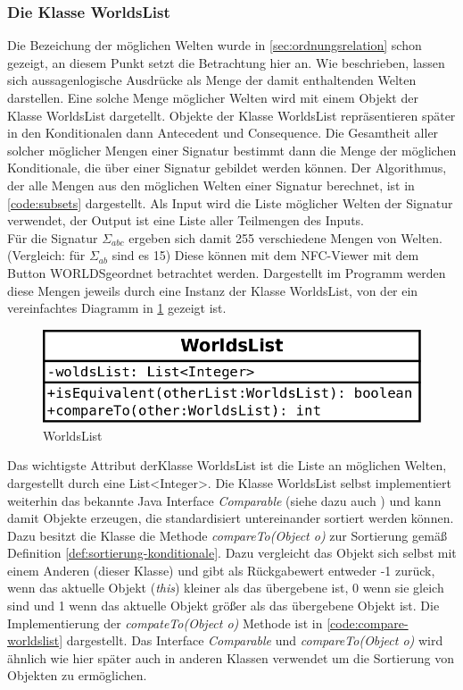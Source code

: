 \documentclass[12pt,a4paper]{article}
\begin{document}
\subsubsection{Die Klasse WorldsList}
\label{sec:worldslist}
Die Bezeichung der möglichen Welten wurde in \autoref{sec:ordnungsrelation} schon gezeigt, an diesem Punkt setzt die Betrachtung hier an. Wie beschrieben, lassen sich aussagenlogische Ausdrücke als Menge der damit enthaltenden Welten darstellen. Eine solche Menge möglicher Welten wird mit einem Objekt der Klasse WorldsList dargetellt. Objekte der Klasse WorldsList repräsentieren später in den Konditionalen dann Antecedent und Consequence. Die Gesamtheit aller solcher möglicher Mengen einer Signatur bestimmt dann die Menge der möglichen Konditionale, die über einer Signatur gebildet werden können. Der Algorithmus, der alle Mengen aus den möglichen Welten einer Signatur berechnet, ist in \autoref{code:subsets} dargestellt. Als Input wird die Liste möglicher Welten der Signatur verwendet, der Output ist eine Liste aller Teilmengen des Inputs. \\
Für die Signatur $\Sigma_{abc}$ ergeben sich damit 255 verschiedene Mengen von Welten. (Vergleich: für $\Sigma_{ab}$ sind es 15) Diese können mit dem NFC-Viewer mit dem Button \glqq WORLDS\grqq \space geordnet betrachtet werden. Dargestellt im Programm werden diese Mengen jeweils durch eine Instanz der Klasse WorldsList, von der ein vereinfachtes Diagramm in \ref{pic:worldslist} gezeigt ist. 


\begin{figure}
\includegraphics[width=0.45\linewidth]{bilder/worldslist.png}
\caption{WorldsList}
\label{pic:worldslist}
\end{figure}


Das wichtigste Attribut derKlasse WorldsList ist die Liste an möglichen Welten, dargestellt durch eine List<Integer>. Die Klasse WorldsList selbst implementiert weiterhin das bekannte Java Interface  \textit{Comparable} (siehe dazu auch \cite{oracle2019}) und kann damit Objekte erzeugen, die standardisiert untereinander sortiert werden können. Dazu besitzt die Klasse die Methode \textit{compareTo(Object o)} zur Sortierung gemäß Definition \ref{def:sortierung-konditionale}. Dazu vergleicht das Objekt sich selbst mit einem Anderen (dieser Klasse) und gibt als Rückgabewert entweder -1 zurück, wenn das aktuelle  Objekt (\textit{this}) kleiner als das übergebene ist, 0 wenn sie gleich sind und 1 wenn das aktuelle Objekt größer als das übergebene Objekt ist. Die Implementierung der \textit{compateTo(Object o)} Methode ist in \autoref{code:compare-worldslist} dargestellt. Das Interface  \textit{Comparable} und \textit{compareTo(Object o)} wird ähnlich wie hier später auch in anderen Klassen verwendet um die Sortierung von Objekten zu ermöglichen.
\end{document}
